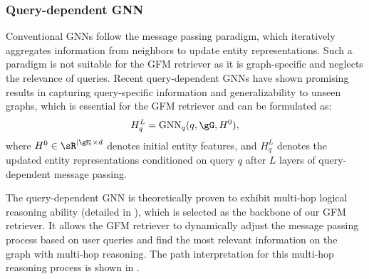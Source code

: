 \subsubsection{Query-dependent GNN}\label{sec:message-passing}
Conventional GNNs \citep{gilmer2017neural} follow the message passing paradigm, which iteratively aggregates information from neighbors to update entity representations. Such a paradigm is not suitable for the GFM retriever as it is graph-specific and neglects the relevance of queries. Recent query-dependent GNNs \citep{zhu2021neural,galkintowards} have shown promising results in capturing query-specific information and generalizability to unseen graphs, which is essential for the GFM retriever and can be formulated as: 
\begin{equation}
    \setlength\abovedisplayskip{2pt}%
    \setlength\belowdisplayskip{2pt}
        H_q^L = \text{GNN}_q(q,\gG,H^0),
\end{equation}
where $H^0\in\sR^{|\gE|\times d}$ denotes initial entity features, and $H_q^L$ denotes the updated entity representations conditioned on query $q$ after $L$ layers of query-dependent message passing. 

The query-dependent GNN is theoretically proven to exhibit multi-hop logical reasoning ability \citep{huang2023theory,yasunaga2021qa,qiuunderstanding} (detailed in ), which is selected as the backbone of our GFM retriever. It allows the GFM retriever to dynamically adjust the message passing process based on user queries and find the most relevant information on the graph with multi-hop reasoning. The path interpretation for this multi-hop reasoning process is shown in .

